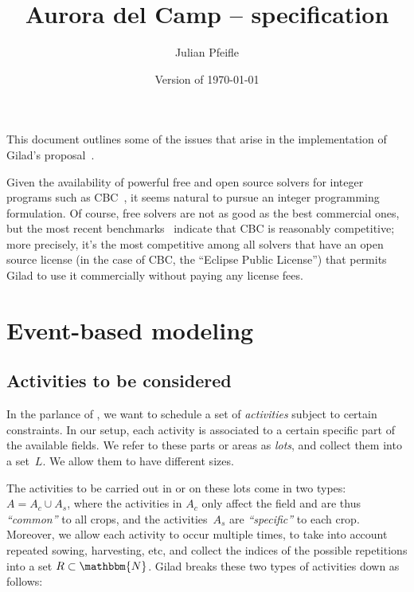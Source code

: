 \documentclass[11pt]{amsart}
\newcommand{\NN}{\mathbbm{N}}
\numberwithin{equation}{section}
\begin{document}
\renewcommand*\descriptionlabel[1]{%
\hspace\labelsep\normalfont\itshape #1:}

\title{Aurora del Camp -- specification}
\author{Julian Pfeifle}
\date{Version of \today}
\maketitle

This document outlines some of the issues that arise in the
implementation of Gilad's proposal~\cite{buzi11}.

\medskip
Given the availability of powerful free and open source solvers for
integer programs such as CBC~\cite{cbc}, it seems natural to pursue an
integer programming formulation. Of course, free solvers are not as
good as the best commercial ones, but the most recent
benchmarks~\cite{mittelmann11} indicate that CBC is reasonably
competitive; more precisely, it's the most competitive among all
solvers that have an open source license (in the case of CBC, the
``Eclipse Public License'') that permits Gilad to use it commercially
without paying any license fees.

\section{Event-based modeling}


\subsection{Activities to be considered}

In the parlance of \cite{artigues-etal11}, we want to schedule a set
of \emph{activities} subject to certain constraints. In our setup,
each activity is associated to a certain specific part of the
available fields. We refer to these parts or areas as \emph{lots}, and
collect them into a set~$L$. We allow them to have different
sizes.

The activities to be carried out in or on these lots come in two types: $A=A_c\cup A_s$,
where the activities in $A_c$ only affect the field and are thus \emph{``common''} to all
crops, and the activities~$A_s$ are \emph{``specific''} to each crop. Moreover, we allow
each activity to occur multiple times, to take into account repeated sowing, harvesting,
etc, and collect the indices of the possible repetitions into a set $R\subset\NN$.  Gilad
breaks these two types of activities down as follows:
\end{document}
